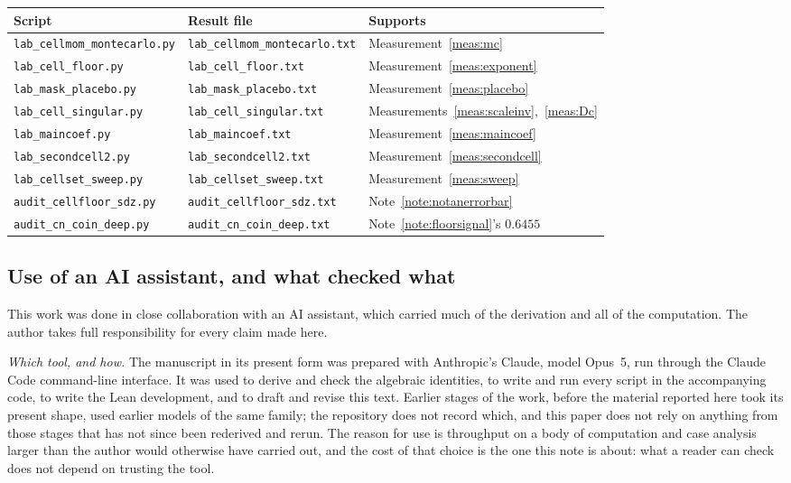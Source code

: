 \documentclass[11pt,a4paper]{article}
\theoremstyle{plain}
\theoremstyle{definition}
\theoremstyle{remark}
\begin{document}
\begin{center}
\begin{tabular}{lll}
\hline
Script & Result file & Supports\\
\hline
\texttt{lab\_cellmom\_montecarlo.py} &
 \texttt{lab\_cellmom\_montecarlo.txt} & Measurement~\ref{meas:mc}\\
\texttt{lab\_cell\_floor.py} & \texttt{lab\_cell\_floor.txt}
 & Measurement~\ref{meas:exponent}\\
\texttt{lab\_mask\_placebo.py} & \texttt{lab\_mask\_placebo.txt}
 & Measurement~\ref{meas:placebo}\\
\texttt{lab\_cell\_singular.py} & \texttt{lab\_cell\_singular.txt}
 & Measurements~\ref{meas:scaleinv},~\ref{meas:Dc}\\
\texttt{lab\_maincoef.py} & \texttt{lab\_maincoef.txt}
 & Measurement~\ref{meas:maincoef}\\
\texttt{lab\_secondcell2.py} & \texttt{lab\_secondcell2.txt}
 & Measurement~\ref{meas:secondcell}\\
\texttt{lab\_cellset\_sweep.py} & \texttt{lab\_cellset\_sweep.txt}
 & Measurement~\ref{meas:sweep}\\
\texttt{audit\_cellfloor\_sdz.py} & \texttt{audit\_cellfloor\_sdz.txt}
 & Note~\ref{note:notanerrorbar}\\
\texttt{audit\_cn\_coin\_deep.py} & \texttt{audit\_cn\_coin\_deep.txt}
 & Note~\ref{note:floorsignal}'s $0.6455$\\
\hline
\end{tabular}
\end{center}

\subsection*{Use of an AI assistant, and what checked what}

This work was done in close collaboration with an AI assistant, which
carried much of the derivation and all of the computation. The author
takes full responsibility for every claim made here.

\emph{Which tool, and how.} The manuscript in its present form was
prepared with Anthropic's Claude, model Opus~5, run through the Claude
Code command-line interface. It was used to derive and check the
algebraic identities, to write and run every script in the accompanying
code, to write the Lean development, and to draft and revise this text.
Earlier stages of the work, before the material reported here took its
present shape, used earlier models of the same family; the repository
does not record which, and this paper does not rely on anything from
those stages that has not since been rederived and rerun. The reason
for use is throughput on a body of computation and case analysis larger
than the author would otherwise have carried out, and the cost of that
choice is the one this note is about: what a reader can check does not
depend on trusting the tool.
\end{document}
